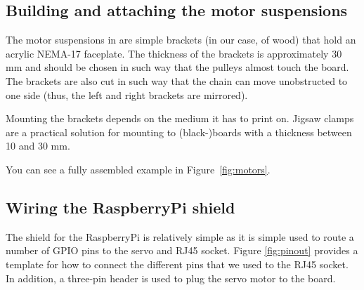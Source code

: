 \documentclass[a4paper,10pt]{article}
\begin{document}
\subsection{Building and attaching the motor suspensions}

The motor suspensions in are simple brackets (in our case, of wood) that hold an acrylic NEMA-17 faceplate. The thickness of the brackets is approximately 30 mm and should be chosen in such way that the pulleys almost touch the board. The brackets are also cut in such way that the chain can move unobstructed to one side (thus, the left and right brackets are mirrored).

Mounting the brackets depends on the medium it has to print on. Jigsaw clamps are a practical solution for mounting to (black-)boards with a thickness between 10 and 30 mm.

You can see a fully assembled example in Figure~\ref{fig:motors}.


\subsection{Wiring the RaspberryPi shield}

The shield for the RaspberryPi is relatively simple as it is simple used to route a number of GPIO pins to the servo and RJ45 socket. Figure \ref{fig:pinout} provides a template for how to connect the different pins that we used to the RJ45 socket. In addition, a three-pin header is used to plug the servo motor to the board.
\end{document}

